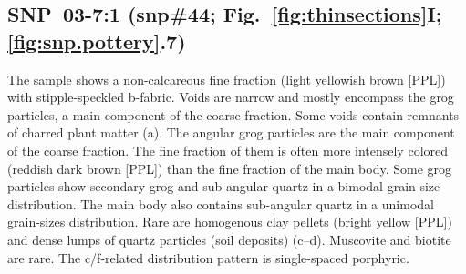 \documentclass[a4paper]{article}
\begin{document}
\begin{figure}[H]
	\caption{}
	\label{fig:46_snp}
\end{figure}

\newpage\subsection{SNP~03-7:1 (snp\#44; Fig.~\ref{fig:thinsections}I; \ref{fig:snp.pottery}.7)}

\begin{multicols}{2}
\noindent The sample shows a non-calcareous fine fraction (light yellowish brown [PPL]) with stipple-speckled b-fabric. Voids are narrow and mostly encompass the grog particles, a main component of the coarse fraction. Some voids contain remnants of charred plant matter (a). The angular grog particles are the main component of the coarse fraction. The fine fraction of them is often more intensely colored (reddish dark brown [PPL]) than the fine fraction of the main body. Some grog particles show secondary grog and sub-angular quartz in a bimodal grain size distribution. The main body also contains sub-angular quartz in a unimodal grain-sizes distribution. Rare are homogenous clay pellets (bright yellow [PPL]) and dense lumps of quartz particles (soil deposits) (c--d). Muscovite and biotite are rare. The c/f-related distribution pattern is single-spaced porphyric.
\end{multicols}
\end{document}
